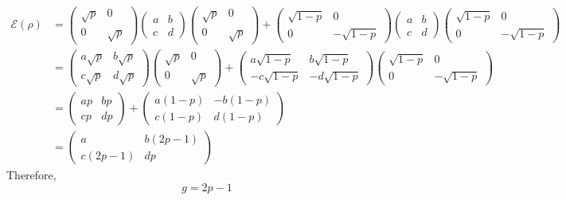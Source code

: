 \begin{align}
    \mathcal{E}(\rho) &= \begin{pmatrix}\sqrt{p} & 0 \\ 0 & \sqrt{p} \end{pmatrix} \begin{pmatrix}a & b \\ c & d \end{pmatrix} \begin{pmatrix}\sqrt{p} & 0 \\ 0 & \sqrt{p} \end{pmatrix} + \begin{pmatrix}\sqrt{1-p} & 0 \\ 0 & -\sqrt{1-p} \end{pmatrix} \begin{pmatrix}a & b \\ c & d \end{pmatrix} \begin{pmatrix}\sqrt{1-p} & 0 \\ 0 & -\sqrt{1-p} \end{pmatrix} \\
    &= \begin{pmatrix}a\sqrt{p} & b\sqrt{p} \\ c\sqrt{p} & d\sqrt{p} \end{pmatrix}\begin{pmatrix}\sqrt{p} & 0 \\ 0 & \sqrt{p} \end{pmatrix} + \begin{pmatrix}a\sqrt{1-p} & b\sqrt{1-p} \\ -c\sqrt{1-p} & -d\sqrt{1-p} \end{pmatrix} \begin{pmatrix}\sqrt{1-p} & 0 \\ 0 & -\sqrt{1-p} \end{pmatrix}\\
    &= \begin{pmatrix}ap & bp \\ cp & dp \end{pmatrix} + \begin{pmatrix}a(1-p) & -b(1-p) \\ c(1-p) & d(1-p) \end{pmatrix} \\
    &= \begin{pmatrix}a & b(2p-1) \\ c(2p-1) & dp \end{pmatrix}
\end{align}
Therefore,
\begin{equation}
    g = 2p - 1
\end{equation}



